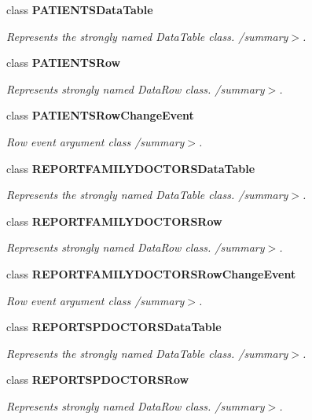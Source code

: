 \begin{CompactItemize}
class {\bf PATIENTSDataTable}
\begin{CompactList}\small\item\em Represents the strongly named DataTable class. /summary$>$. \item\end{CompactList}\item 
class {\bf PATIENTSRow}
\begin{CompactList}\small\item\em Represents strongly named DataRow class. /summary$>$. \item\end{CompactList}\item 
class {\bf PATIENTSRowChangeEvent}
\begin{CompactList}\small\item\em Row event argument class /summary$>$. \item\end{CompactList}\item 
class {\bf REPORTFAMILYDOCTORSDataTable}
\begin{CompactList}\small\item\em Represents the strongly named DataTable class. /summary$>$. \item\end{CompactList}\item 
class {\bf REPORTFAMILYDOCTORSRow}
\begin{CompactList}\small\item\em Represents strongly named DataRow class. /summary$>$. \item\end{CompactList}\item 
class {\bf REPORTFAMILYDOCTORSRowChangeEvent}
\begin{CompactList}\small\item\em Row event argument class /summary$>$. \item\end{CompactList}\item 
class {\bf REPORTSPDOCTORSDataTable}
\begin{CompactList}\small\item\em Represents the strongly named DataTable class. /summary$>$. \item\end{CompactList}\item 
class {\bf REPORTSPDOCTORSRow}
\begin{CompactList}\small\item\em Represents strongly named DataRow class. /summary$>$. \item\end{CompactList}\item 

\end{CompactItemize}
